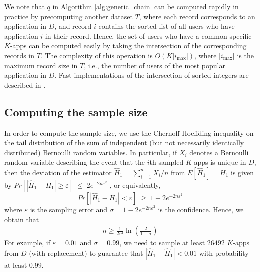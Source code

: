 \documentclass{acm_proc_article-sp}
\theoremstyle{plain}
\theoremstyle{plain}
\theoremstyle{plain}
\theoremstyle{plain}
\theoremstyle{plain}
\theoremstyle{plain}
\begin{document}
We note that $q$ in Algorithm \ref{alg:generic_chain} can be computed rapidly in practice by precomputing another dataset $T$, where each record corresponds to an application in $D$, and record $i$ contains the sorted list of all users who have application $i$ in their record. Hence, the set of users who have a common specific $K$-apps can be  computed easily  by taking the intersection of the corresponding records in $T$. The complexity of this operation is $O(K|i_{\max}|)$, where $|i_{\max}|$ is the maximum record size in $T$, i.e., the number of users of the most popular application in $D$. Fast implementations of the intersection of sorted integers are described in \cite{LemireBK14}. 






\subsection{Computing the sample size}

In order to compute the sample size, we use the Chernoff-Hoeffding inequality \cite{Hoeffding1963} on the tail distribution of the sum of independent (but not necessarily identically distributed) Bernoulli random variables. In particular, if $X_i$ denotes a Bernoulli random variable describing the event that the $i$th sampled $K$-apps is unique in $D$, then the deviation of the estimator $\hat{H}_1 = \sum_{i=1}^{n} X_i / n $ from $E[\hat{H}_1] = H_1$ is given by 
$
Pr\left[\left|\hat{H}_1  - H_1\right|\geq \varepsilon\right] \; 	 \leq \; 	2e^{-2n\varepsilon^2}
$
, or equivalently,
\begin{equation}
\label{eq:chernoff}
Pr\left[\left|\hat{H}_1  - H_1\right|< \varepsilon\right] \; 	 \geq \; 	1 - 2e^{-2n\varepsilon^2}
\end{equation}
where $\varepsilon$ is the sampling error and $\sigma = 1 - 2e^{-2n\varepsilon^2}$ is the confidence. Hence, we obtain that 
\begin{align}
\label{eq:sampling_bound}
n \geq \frac{1}{2\varepsilon^2} \ln\left(\frac{2}{1-\sigma}\right)
\end{align}
For example, if $\varepsilon = 0.01$ and $\sigma = 0.99$, we need to sample at least $26492$ $K$-apps from $D$ (with replacement) to guarantee that $|\hat{H}_1 -\hat{H}_1| < 0.01$ with probability at least $0.99$.
\end{document}
